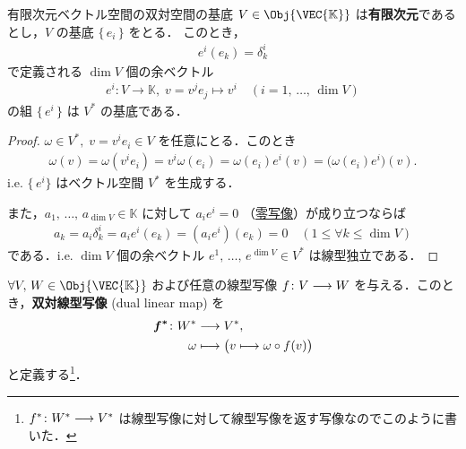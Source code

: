 \documentclass[geometry_main]{subfiles}
\begin{document}

\begin{myprop}[label=def.basisforDVS]{有限次元ベクトル空間の双対空間の基底}
	$V \in \Obj{\VEC{\mathbb{K}}}$ は\textbf{有限次元}であるとし，$V$ の基底 $\{\, e_i\, \}$ をとる．
	このとき，
	\begin{align}
		e^i(e_k) = \delta^i_k
	\end{align}
	で定義される
	$\dim V$ 個の余ベクトル
	\begin{align}
		\label{eq.duality}
		e^i \colon V \to \mathbb{K},\; v = v^j e_j \mapsto v^i \quad (i = 1,\, \dots,\, \dim V)
	\end{align}
	の組 $\{\, e^i\, \}$ は $V^*$ の基底である．
\end{myprop}

\begin{proof}
	$\omega \in V^*,\; v = v^i e_i \in V$ を任意にとる．このとき
	\begin{align}
		\omega(v) = \omega(v^i e_i) = v^i \omega(e_i) = \omega(e_i) e^i(v) = \bigl(\omega(e_i) e^i\bigr)(v).
	\end{align}
	i.e. $\{\, e^i \}$ はベクトル空間 $V^*$ を生成する．
	
	また，$a_1,\, \dots,\, a_{\dim V} \in \mathbb{K}$ に対して $a_i e^i = 0$ （\hyperref[prop:initial-terminal-vec]{零写像}）が成り立つならば
	\begin{align}
		a_k = a_i \delta^i_k = a_i e^i(e_k) = (a_i e^i)(e_k) = 0 \quad (1 \le \forall k \le \dim V)
	\end{align}
	である．i.e. $\dim V$ 個の余ベクトル $e^1,\, \dots,\, e^{\dim V} \in V^*$ は線型独立である．
\end{proof}

$\forall V,\, W \in \Obj{\VEC{\mathbb{K}}}$ および任意の線型写像 $f \colon V \longrightarrow W$ を与える．このとき，\textbf{双対線型写像} (dual linear map) を
\begin{align}
	\bm{f^*} \colon W^* &\longrightarrow V^*, \\
	\omega &\longmapsto \bigl( v \longmapsto \omega \circ f(v) \bigr) 
\end{align}
と定義する\footnote{$f^* \colon W^* \longrightarrow V^*$ は線型写像に対して線型写像を返す写像なのでこのように書いた．}．
\end{document}
